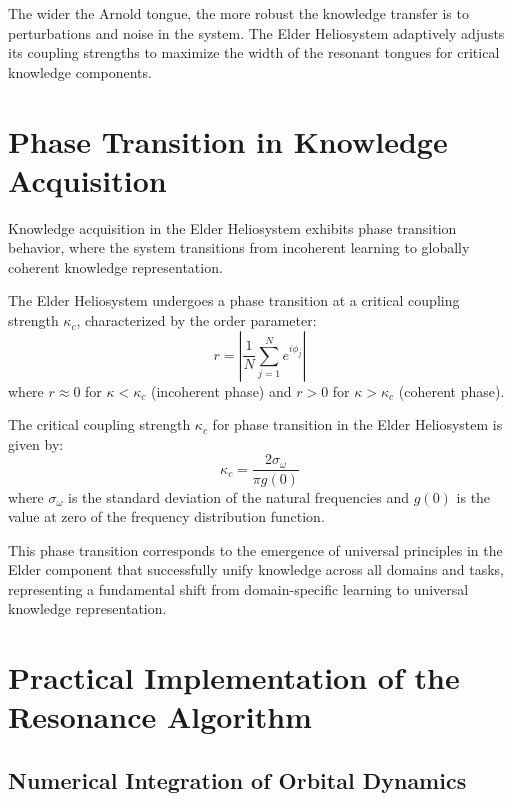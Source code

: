 The wider the Arnold tongue, the more robust the knowledge transfer is to perturbations and noise in the system. The Elder Heliosystem adaptively adjusts its coupling strengths to maximize the width of the resonant tongues for critical knowledge components.

\section{Phase Transition in Knowledge Acquisition}

Knowledge acquisition in the Elder Heliosystem exhibits phase transition behavior, where the system transitions from incoherent learning to globally coherent knowledge representation.

\begin{theorem}
The Elder Heliosystem undergoes a phase transition at a critical coupling strength $\kappa_c$, characterized by the order parameter:
\begin{equation}
r = \left| \frac{1}{N} \sum_{j=1}^N e^{i\phi_j} \right|
\end{equation}
where $r \approx 0$ for $\kappa < \kappa_c$ (incoherent phase) and $r > 0$ for $\kappa > \kappa_c$ (coherent phase).
\end{theorem}

\begin{lemma}
The critical coupling strength $\kappa_c$ for phase transition in the Elder Heliosystem is given by:
\begin{equation}
\kappa_c = \frac{2\sigma_{\omega}}{\pi g(0)}
\end{equation}
where $\sigma_{\omega}$ is the standard deviation of the natural frequencies and $g(0)$ is the value at zero of the frequency distribution function.
\end{lemma}

This phase transition corresponds to the emergence of universal principles in the Elder component that successfully unify knowledge across all domains and tasks, representing a fundamental shift from domain-specific learning to universal knowledge representation.

\section{Practical Implementation of the Resonance Algorithm}

\subsection{Numerical Integration of Orbital Dynamics}

